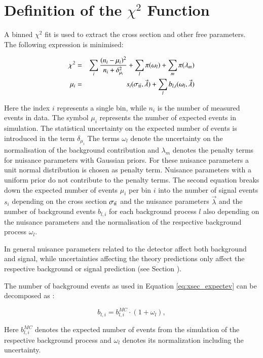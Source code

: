     
\section{Definition of the $\chi^2$ Function}
\label{sec:xsec_stat}

A binned $\chi^2$ fit is used to extract the cross section and other free parameters.
The following expression is minimised:

\begin{eqnarray}
  \chi^2  &=& \sum_{i} \frac{(n_i-\mu_i)^2}{n_i + \delta_{\mu_i}^2} + \sum_{l} \pi(\omega_l) + \sum_{m} \pi(\lambda_m) \\
  \mu_i &=& s_i(\sigma_\mathrm{t\bar{t}},\vec{\lambda}) + \sum_{l} b_{l,i}(\omega_l,\vec{\lambda})
\label{eq:xsec_chisqfunct}
\end{eqnarray}

Here the index $i$ represents a single bin, while $n_i$ is the number of measured events in data. The symbol $\mu_i$ represents the number
of expected events in simulation. The statistical uncertainty on the expected number of events is introduced in the term $\delta_{\mu_i}$ The terms $\omega_l$ denote the uncertainty on the normalisation of the background contribution and $\lambda_m$
denotes the penalty terms for nuisance parameters with Gaussian priors. For these nuisance parameters a unit normal distribution is chosen as penalty term. Nuisance parameters with a uniform prior do not contribute to the penalty terms.
The second equation breaks down the expected number of events $\mu_i$ per bin $i$ into the number of signal events $s_i$ depending on the \ttbar cross section $\sigma_\mathrm{t\bar{t}}$ and the nuisance parameters $\vec{\lambda}$ and the number of
background events  $b_{l,i}$ for each background process $l$ also depending on the nuisance parameters and the normalisation of the respective background process $\omega_l$.

In general nuisance parameters related to the detector affect both background and signal, while uncertainties affecting the theory predictions only affect the respective background or signal prediction (see Section ).


The number of background events as used in Equation \ref{eq:xsec_expectev} can be decomposed as :

\begin{equation}
b_{l,i} = b_{l,i}^{MC} \cdot (1 + \omega_l),
\label{eq:nbli}
\end{equation}

Here $b_{l,i}^{MC}$ denotes the expected number of events from the simulation of the respective background process and $\omega_l$ denotes its normalization including the uncertainty.

